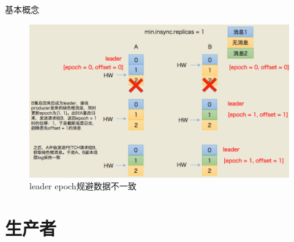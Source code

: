 \begin{frame}[plain,t]{基本概念} %
 \\  \vspace{1ex}

	\begin{figure}
		\centering
		\includegraphics[width=0.9\linewidth]{image/0109}
		\caption{leader epoch规避数据不一致}
		\label{fig:0108}
	\end{figure}
	
\end{frame}


\section{生产者}
